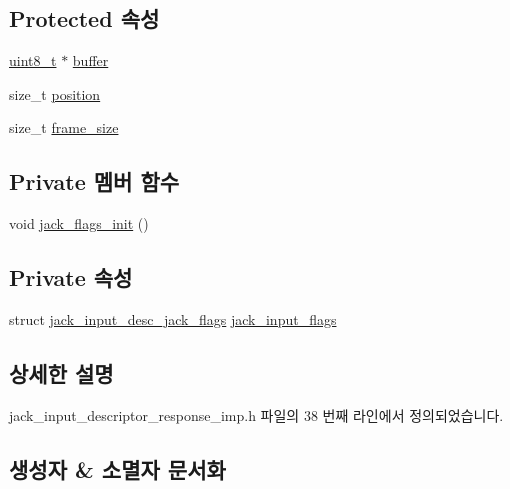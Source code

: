 \subsection*{Protected 속성}
\begin{DoxyCompactItemize}
\item 
\hyperlink{stdint_8h_aba7bc1797add20fe3efdf37ced1182c5}{uint8\+\_\+t} $\ast$ \hyperlink{classavdecc__lib_1_1descriptor__response__base__imp_a56ed84df35de10bdb65e72b184309497}{buffer}
\item 
size\+\_\+t \hyperlink{classavdecc__lib_1_1descriptor__response__base__imp_a7a04afe5347934be732ec70a70bd0a28}{position}
\item 
size\+\_\+t \hyperlink{classavdecc__lib_1_1descriptor__response__base__imp_affd041a595cabab98275245b9cb2824d}{frame\+\_\+size}
\end{DoxyCompactItemize}
\subsection*{Private 멤버 함수}
\begin{DoxyCompactItemize}
\item 
void \hyperlink{classavdecc__lib_1_1jack__input__descriptor__response__imp_a6de95e6c9b0a71154f1451a6a19da19f}{jack\+\_\+flags\+\_\+init} ()
\end{DoxyCompactItemize}
\subsection*{Private 속성}
\begin{DoxyCompactItemize}
\item 
struct \hyperlink{structavdecc__lib_1_1jack__input__descriptor__response__imp_1_1jack__input__desc__jack__flags}{jack\+\_\+input\+\_\+desc\+\_\+jack\+\_\+flags} \hyperlink{classavdecc__lib_1_1jack__input__descriptor__response__imp_a279c007c1e27517923deabafa009d1d7}{jack\+\_\+input\+\_\+flags}
\end{DoxyCompactItemize}


\subsection{상세한 설명}


jack\+\_\+input\+\_\+descriptor\+\_\+response\+\_\+imp.\+h 파일의 38 번째 라인에서 정의되었습니다.



\subsection{생성자 \& 소멸자 문서화}

